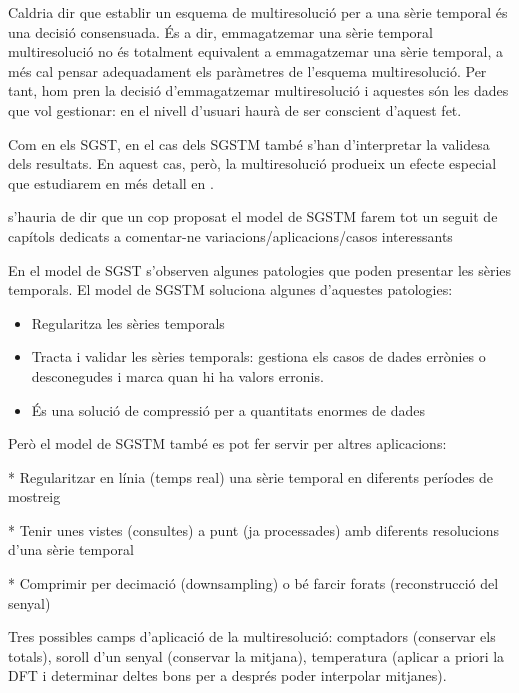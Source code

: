 \todo{}
Caldria dir que establir un esquema de multiresolució per a una sèrie temporal és una decisió consensuada. És a dir, emmagatzemar una sèrie temporal multiresolució no és totalment equivalent a emmagatzemar una sèrie temporal, a més cal pensar adequadament els paràmetres de l'esquema multiresolució. Per tant, hom pren la decisió d'emmagatzemar multiresolució i aquestes són les dades que vol gestionar: en el nivell d'usuari haurà de ser conscient d'aquest fet.

Com en els \gls{SGST}, en el cas dels \gls{SGSTM} també s'han
d'interpretar la validesa dels resultats. En aquest cas, però, la
multiresolució produeix un efecte especial que estudiarem en més
detall en .





s'hauria de dir que un cop proposat el model de \gls{SGSTM} farem tot un seguit de capítols dedicats a comentar-ne variacions/aplicacions/casos interessants







En el model de SGST s'observen algunes patologies que poden presentar les sèries temporals. El model de SGSTM soluciona algunes d'aquestes patologies:

\begin{itemize}
\item Regularitza les sèries temporals
\item Tracta i validar les sèries temporals: gestiona els casos de dades errònies o desconegudes i marca quan hi ha valors erronis.
\item És una solució de compressió per a quantitats enormes de dades
\end{itemize}


Però el model de SGSTM també es pot fer servir per altres aplicacions:

* Regularitzar en línia (temps real) una sèrie temporal en diferents períodes de mostreig

* Tenir unes vistes (consultes) a punt (ja processades) amb diferents resolucions d'una sèrie temporal

* Comprimir per decimació (downsampling) o bé farcir forats (reconstrucció del senyal)


Tres possibles camps d'aplicació de la multiresolució: comptadors (conservar els totals), soroll d'un senyal (conservar la mitjana), temperatura (aplicar a priori la DFT i determinar deltes bons per a després poder interpolar mitjanes).




